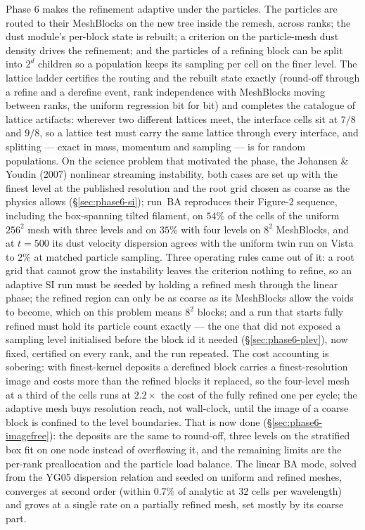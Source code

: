 \documentclass[11pt]{article}
\begin{document}
Phase 6 makes the refinement adaptive under the particles. The particles are routed to
their MeshBlocks on the new tree inside the remesh, across ranks; the dust module's
per-block state is rebuilt; a criterion on the particle-mesh dust density drives the
refinement; and the particles of a refining block can be split into $2^d$ children so a
population keeps its sampling per cell on the finer level. The lattice ladder certifies
the routing and the rebuilt state exactly (round-off through a refine and a derefine
event, rank independence with MeshBlocks moving between ranks, the uniform regression bit
for bit) and completes the catalogue of lattice artifacts: wherever two different
lattices meet, the interface cells sit at $7/8$ and $9/8$, so a lattice test must carry
the same lattice through every interface, and splitting --- exact in mass, momentum and
sampling --- is for random populations. On the science problem that motivated the phase,
the Johansen \& Youdin (2007) nonlinear streaming instability, both cases are set up with
the finest level at the published resolution and the root grid chosen as coarse as the
physics allows (\S\ref{sec:phase6-si}); run~BA reproduces their Figure-2 sequence,
including the box-spanning tilted filament, on $54\%$ of the cells of the uniform $256^2$
mesh with three levels and on $35\%$ with four levels on $8^2$ MeshBlocks, and at
$t = 500$ its dust velocity dispersion agrees with the uniform twin run on Vista to
$2\%$ at matched particle sampling. Three operating rules came out of it: a root grid that cannot grow the
instability leaves the criterion nothing to refine, so an adaptive SI run must be seeded
by holding a refined mesh through the linear phase; the refined region can only be as
coarse as its MeshBlocks allow the voids to become, which on this problem means $8^2$
blocks; and a run that starts fully refined must hold its particle count exactly --- the
one that did not exposed a sampling level initialised before the block id it needed
(\S\ref{sec:phase6-plev}), now fixed, certified on every rank, and the run repeated. The
cost accounting is sobering: with finest-kernel deposits a derefined block carries a
finest-resolution image and costs more than the refined blocks it replaced, so the
four-level mesh at a third of the cells runs at $2.2\times$ the cost of the fully refined
one per cycle; the adaptive mesh buys resolution reach, not wall-clock, until the image
of a coarse block is confined to the level boundaries. That is now done
(\S\ref{sec:phase6-imagefree}): the deposits are the same to round-off, three levels on the
stratified box fit on one node instead of overflowing it, and the remaining limits are the
per-rank preallocation and the particle load balance. The linear BA mode,
solved from the YG05 dispersion relation and seeded on uniform and refined meshes, converges
at second order (within $0.7\%$ of analytic at $32$ cells per wavelength) and grows at a
single rate on a partially refined mesh, set mostly by its coarse part.
\end{document}

